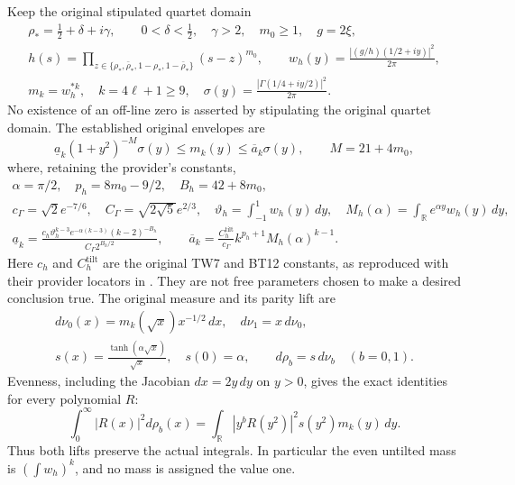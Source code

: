 \documentclass[11pt]{article}
\newcommand{\R}{\mathbb R}
\begin{document}
Keep the original stipulated quartet domain
\begin{equation}\tag{NR1}\label{nr:original}
\begin{gathered}
 \rho_*=\tfrac12+\delta+i\gamma,\qquad
 0<\delta<\tfrac12,\quad \gamma>2,\quad m_0\ge1,\quad g=2\xi,\\
 h(s)=\prod_{z\in\{\rho_*,\bar\rho_*,1-\rho_*,1-\bar\rho_*\}}(s-z)^{m_0},
 \qquad w_h(y)=\frac{|(g/h)(1/2+iy)|^2}{2\pi},\\
 m_k=w_h^{*k},\quad k=4\ell+1\ge9,\quad
 \sigma(y)=\frac{|\Gamma(1/4+iy/2)|^2}{2\pi}.
\end{gathered}
\end{equation}
No existence of an off-line zero is asserted by stipulating the original
quartet domain. The established original envelopes are
\begin{equation}\tag{NR2}\label{nr:envelope}
 \underline a_k(1+y^2)^{-M}\sigma(y)
 \le m_k(y)\le \overline a_k\sigma(y),\qquad M=21+4m_0,
\end{equation}
where, retaining the provider's constants,
\begin{equation}\tag{NR3}\label{nr:constants}
\begin{gathered}
 \alpha=\pi/2,\quad p_h=8m_0-9/2,\quad B_h=42+8m_0,\\
 c_\Gamma=\sqrt2e^{-7/6},\quad C_\Gamma=\sqrt{2\sqrt5}e^{2/3},\quad
 \vartheta_h=\int_{-1}^1w_h(y)\,dy,\quad
 M_h(\alpha)=\int_\R e^{\alpha y}w_h(y)\,dy,\\
 \underline a_k=
 \frac{c_h\vartheta_h^{k-3}e^{-\alpha(k-3)}(k-2)^{-B_h}}
 {C_\Gamma2^{B_h/2}},\qquad
 \overline a_k=\frac{C_h^{\mathrm{tilt}}}{c_\Gamma}
 k^{p_h+1}M_h(\alpha)^{k-1}.
\end{gathered}
\end{equation}
Here $c_h$ and $C_h^{\mathrm{tilt}}$ are the original TW7 and BT12
constants, as reproduced with their provider locators in \cite{NP}.
They are not free parameters chosen to make a desired conclusion true.
The original measure and its parity lift are
\begin{equation}\tag{NR4}\label{nr:measures}
 \begin{gathered}
 d\nu_0(x)=m_k(\sqrt x)x^{-1/2}\,dx,\quad d\nu_1=x\,d\nu_0,\\
 s(x)=\frac{\tanh(\alpha\sqrt x)}{\sqrt x},\quad s(0)=\alpha,
 \qquad d\rho_b=s\,d\nu_b\quad(b=0,1).
 \end{gathered}
\end{equation}
Evenness, including the Jacobian $dx=2y\,dy$ on $y>0$, gives the
exact identities for every polynomial $R$:
\begin{equation}\tag{NR5}\label{nr:lifts}
 \int_0^\infty|R(x)|^2d\rho_b(x)
 =\int_\R|y^bR(y^2)|^2s(y^2)m_k(y)\,dy.
\end{equation}
Thus both lifts preserve the actual integrals. In particular the even
untilted mass is $(\int w_h)^k$, and no mass is assigned the value one.
\end{document}
